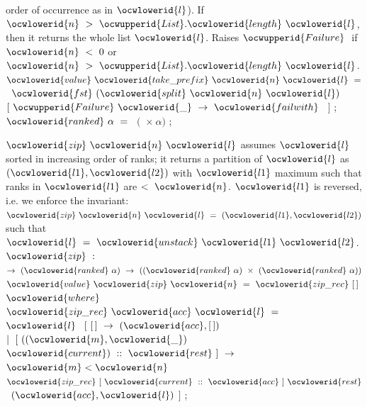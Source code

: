 \documentclass[12pt]{article}
\begin{document}
   order of occurrence as in \ocwbegindcode{}$\ocwlowerid{l}$\ocwenddcode{}).  If \ocwbegindcode{}$\ocwlowerid{n}~>~\ocwupperid{List}.\ocwlowerid{length}~\ocwlowerid{l}$\ocwenddcode{}, then it returns
   the whole list \ocwbegindcode{}$\ocwlowerid{l}$\ocwenddcode{}.  
   Raises \ocwbegindcode{}$\ocwupperid{Failure}~$\ocwenddcode{} if \ocwbegindcode{}$\ocwlowerid{n}~<~0$\ocwenddcode{} or \ocwbegindcode{}$\ocwlowerid{n}~>~\ocwupperid{List}.\ocwlowerid{length}~\ocwlowerid{l}$\ocwenddcode{}.  \ocwec{}\ocweol
\ocwindent{0.00em}
$\ocwlowerid{value}~\ocwlowerid{take\_prefix}~\ocwlowerid{n}~\ocwlowerid{l}~=$\ocweol
\ocwindent{1.00em}
~$\ocwlowerid{fst}~(\ocwlowerid{split}~\ocwlowerid{n}~\ocwlowerid{l})~$~$[~\ocwupperid{Failure}~\ocwlowerid{\_}~\rightarrow{}~\ocwlowerid{failwith}~$~$]$\ocweol
\ocwindent{0.00em}
;\ocweol
\ocwindent{0.00em}
~$\ocwlowerid{ranked}~\alpha{}~=~$~$($~$\times{}~\alpha{})$\ocweol
\ocwindent{0.00em}
;\medskip

\ocwendcode{}\ocwindent{0.00em}
\ocwbegindcode{}$\ocwlowerid{zip}~\ocwlowerid{n}~\ocwlowerid{l}$\ocwenddcode{} assumes \ocwbegindcode{}$\ocwlowerid{l}$\ocwenddcode{} sorted in increasing order of ranks; it returns 
   a partition of \ocwbegindcode{}$\ocwlowerid{l}$\ocwenddcode{} as \ocwbegindcode{}$(\ocwlowerid{l1},\ocwlowerid{l2})$\ocwenddcode{} with \ocwbegindcode{}$\ocwlowerid{l1}$\ocwenddcode{} maximum such that ranks in \ocwbegindcode{}$\ocwlowerid{l1}$\ocwenddcode{}
   are  \ocwbegindcode{}$<~\ocwlowerid{n}$\ocwenddcode{}. \ocwbegindcode{}$\ocwlowerid{l1}$\ocwenddcode{} is reversed, i.e. we enforce the invariant:
   \ocwbegindcode{}$\ocwlowerid{zip}~\ocwlowerid{n}~\ocwlowerid{l}~=~(\ocwlowerid{l1},\ocwlowerid{l2})$\ocwenddcode{} such that \ocwbegindcode{}$\ocwlowerid{l}~=~\ocwlowerid{unstack}~\ocwlowerid{l1}~\ocwlowerid{l2}$\ocwenddcode{}.                      
\ocweol
\ocwindent{0.00em}
\ocwbegindcode{}$\ocwlowerid{zip}~:~$~$\rightarrow{}~(\ocwlowerid{ranked}~\alpha{})~\rightarrow{}~((\ocwlowerid{ranked}~\alpha{})~\times{}~(\ocwlowerid{ranked}~\alpha{}))$\ocwenddcode{}               
\ocweol
\label{../ML/list2.ml:3998}%
\medskip
\ocwbegincode{}\ocwindent{0.00em}
$\ocwlowerid{value}~\ocwlowerid{zip}~\ocwlowerid{n}~=~\ocwlowerid{zip\_rec}~[\,]~$\ocweol
\ocwindent{1.00em}
$\ocwlowerid{where}~$~$\ocwlowerid{zip\_rec}~\ocwlowerid{acc}~\ocwlowerid{l}~=~$~$\ocwlowerid{l}~$\ocweol
\ocwindent{1.00em}
$[~[\,]~\rightarrow{}~(\ocwlowerid{acc},[\,])$\ocweol
\ocwindent{1.00em}
$\mid{}~[~((\ocwlowerid{m},\ocwlowerid{\_})~$~$\ocwlowerid{current})~::~\ocwlowerid{rest}~]~\rightarrow{}~$\ocweol
\ocwindent{3.00em}
~$\ocwlowerid{m}<\ocwlowerid{n}~$~$\ocwlowerid{zip\_rec}~[~\ocwlowerid{current}~::~\ocwlowerid{acc}~]~\ocwlowerid{rest}$\ocweol
\ocwindent{3.00em}
~$(\ocwlowerid{acc},\ocwlowerid{l})$\ocweol
\ocwindent{1.00em}
$]$\ocweol
\ocwindent{0.00em}
;\medskip
\end{document}
